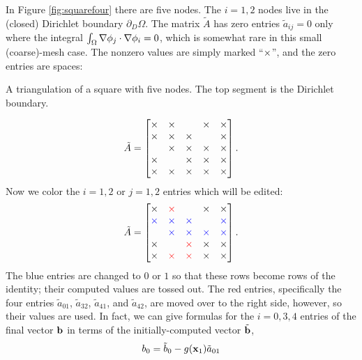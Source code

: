 \medskip\noindent\hrulefill
\begin{example} In Figure \ref{fig:squarefour} there are five nodes.  The $i=1,2$ nodes live in the (closed) Dirichlet boundary $\partial_D \Omega$.  The matrix $\tilde A$ has zero entries $\tilde a_{ij} = 0$ only where the integral $\int_\Omega \nabla \phi_j \cdot \nabla \phi_i=0$, which is somewhat rare in this small (coarse)-mesh case.  The nonzero values are simply marked ``$\times$'', and the zero entries are spaces:\begin{marginfigure}

\caption{A triangulation of a square with five nodes.  The top segment is the Dirichlet boundary.}
\label{fig:squarefour}
\end{marginfigure}%
\begin{equation*}
\tilde A = \begin{bmatrix}
\times & \times &    & \times & \times \\
\times & \times & \times &    & \times \\
   & \times & \times & \times & \times \\
\times &    & \times & \times & \times \\
\times & \times & \times & \times & \times
\end{bmatrix}.
\end{equation*}
Now we color the $i=1,2$ or $j=1,2$ entries which will be edited:
\begin{equation*}
\tilde A = \begin{bmatrix}
\times & {\color{red} \times} &    & \times & \times \\
{\color{blue} \times} & {\color{blue} \times} & {\color{blue} \times} &    & {\color{blue} \times} \\
   & {\color{blue} \times} & {\color{blue} \times} & {\color{blue} \times} & {\color{blue} \times} \\
\times &    & {\color{red} \times} & \times & \times \\
\times & {\color{red} \times} & {\color{red} \times} & \times & \times
\end{bmatrix}.
\end{equation*}
The {\color{blue} blue} entries are changed to $0$ or $1$ so that these rows become rows of the identity; their computed values are tossed out.  The {\color{red} red} entries, specifically the four entries $\tilde a_{01}$, $\tilde a_{32}$, $\tilde a_{41}$, and $\tilde a_{42}$, are moved over to the right side, however, so their values are used.  In fact, we can give formulas for the $i=0,3,4$ entries of the final vector $\mathbf{b}$ in terms of the initially-computed vector $\tilde{\mathbf{b}}$,
\begin{align*}
b_0 &= \tilde b_0 - g(\bx_1) \tilde a_{01} \\

\end{align*}
\end{example}
